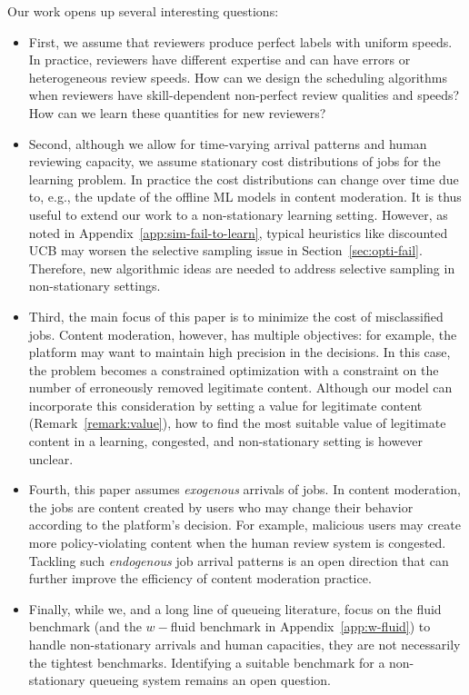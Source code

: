 Our work opens up several interesting questions:
\begin{itemize}
\item First, we assume that reviewers produce perfect labels with uniform speeds. In practice, reviewers have different expertise and can have errors or heterogeneous review speeds. How can we design the scheduling algorithms when reviewers have skill-dependent non-perfect review qualities and speeds? How can we learn these quantities for new reviewers?
\item Second, although we allow for time-varying arrival patterns and human reviewing capacity, we assume stationary cost distributions of jobs for the learning problem. In practice the cost distributions can change over time due to, e.g., the update of the offline ML models in content moderation. It is thus useful to extend our work to a non-stationary learning setting. However, as noted in Appendix~\ref{app:sim-fail-to-learn}, typical heuristics like discounted UCB may worsen the selective sampling issue in Section~\ref{sec:opti-fail}. Therefore, new algorithmic ideas are needed to address selective sampling in non-stationary settings.
\item Third, the main focus of this paper is to minimize the cost of misclassified jobs. Content moderation, however, has multiple objectives: for example, the platform may want to maintain high precision in the decisions. In this case, the problem becomes a constrained optimization with a constraint on the number of erroneously removed legitimate content. Although our model can incorporate this consideration by setting a value for legitimate content (Remark~\ref{remark:value}), how to find the most suitable value of legitimate content in a learning, congested, and non-stationary setting is however unclear.
\item Fourth, this paper assumes \emph{exogenous} arrivals of jobs. In content moderation, the jobs are content created by users who may change their behavior according to the platform's decision. For example, malicious users may create more policy-violating content when the human review system is congested. Tackling such \emph{endogenous} job arrival patterns is an open direction that can further improve the efficiency of content moderation practice.
\item Finally, while we, and a long line of queueing literature, focus on the fluid benchmark (and the $w-$fluid benchmark in Appendix~\ref{app:w-fluid}) to handle non-stationary arrivals and human capacities, they are not necessarily the tightest benchmarks. Identifying a suitable benchmark for a non-stationary queueing system remains an open question.
\end{itemize}